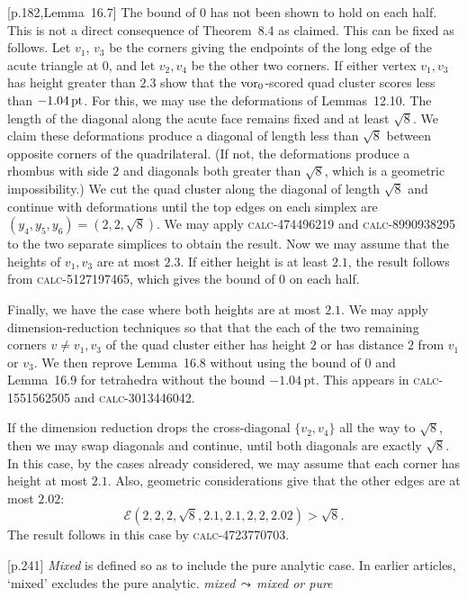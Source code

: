 \documentclass[11pt]{amsart}
\def\op#1{{\text{#1}}}
\def\lto{\ensuremath{\,\leadsto\,}}
\def\text{\hbox}
\def\sz{small} %
\def\rmx{\rm}
\def\calc#1{{\textsc{calc-#1}}}
\def\pt{\mathrm{pt}}
\begin{document}
\begin{\sz}
	
[p.182,Lemma~16.7]  {\rmx The bound of $0$ has not been
shown to hold on each half.  This is not a 
direct consequence
of Theorem~8.4 as claimed.
This can be fixed as follows. 
Let $v_1$, $v_3$ be the corners giving the endpoints of the long edge of the
acute triangle at $0$, and let $v_2,v_4$ be the other two corners.
If either vertex $v_1,v_3$ 
has height greater than $2.3$ show that the $\op{vor}_0$-scored quad cluster scores
less than $-1.04\,\op{pt}$.  
For this, we may use the deformations of Lemmas~12.10.  The length of the diagonal along the acute face remains fixed and at least $\sqrt8$.  We claim these deformations produce a diagonal of length less than $\sqrt8$ between opposite corners of the quadrilateral.  (If not, the deformations produce a rhombus with side $2$ and diagonals both greater than $\sqrt8$, which is a geometric impossibility.)  We cut the quad cluster along the diagonal of length $\sqrt8$ and continue with deformations until the top edges on each simplex are $(y_4,y_5,y_6)=(2,2,\sqrt8)$.  We may apply \calc{474496219} and \calc{8990938295} to the two separate simplices to obtain the result.}
%
%
Now we may assume that the heights of $v_1,v_3$ are at most $2.3$.  If either
height is at least $2.1$, the result follows from \calc{5127197465}, which gives
the bound of $0$ on each half.

Finally, we have the case where both heights are at most $2.1$.  We may apply
dimension-reduction techniques so that that the each of the two
remaining corners $v\ne v_1,v_3$
of the quad cluster either has height $2$ or has distance $2$ from $v_1$ or $v_3$.
We then reprove Lemma~16.8 without using the bound of $0$ and Lemma~16.9 for tetrahedra without the bound  $-1.04\,\pt$.  This appears in \calc{1551562505} and \calc{3013446042}.  

If the dimension reduction drops the cross-diagonal $\{v_2,v_4\}$ all the way to $\sqrt8$, then we may swap diagonals and continue, until both diagonals are exactly $\sqrt8$.  In this case, by the cases already considered, we may assume that each corner has height at most $2.1$.  Also, geometric considerations give that the other edges are at most $2.02$:
  $$
  {\mathcal E}(2,2,2,\sqrt8,2.1,2.1,2,2,2.02) >\sqrt8.
  $$
The result follows in this case by \calc{4723770703}.






[p.241]  {\rmx {\it Mixed} is defined so as to include
the pure analytic case.  In earlier articles,
`mixed' excludes the pure analytic.  }
	{\it mixed\lto mixed or pure}
	

\end{\sz}
\end{document}
